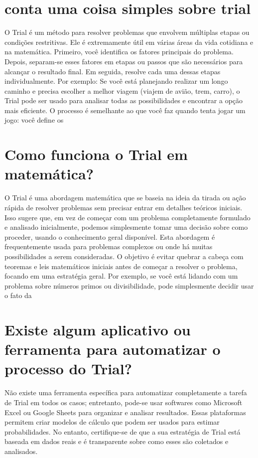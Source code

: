 \documentclass[11pt,a4paper]{article}
\begin{document}
\section{conta uma coisa simples sobre trial}
O Trial é um método para resolver problemas que envolvem múltiplas etapas ou condições restritivas. Ele é extremamente útil em várias áreas da vida cotidiana e na matemática. Primeiro, você identifica os fatores principais do problema. Depois, separam-se esses fatores em etapas ou passos que são necessários para alcançar o resultado final. Em seguida, resolve cada uma dessas etapas individualmente. Por exemplo: Se você está planejando realizar um longo caminho e precisa escolher a melhor viagem (viajem de avião, trem, carro), o Trial pode ser usado para analisar todas as possibilidades e encontrar a opção mais eficiente. O processo é semelhante ao que você faz quando tenta jogar um jogo: você define os

\section{Como funciona o Trial em matemática?}
O Trial é uma abordagem matemática que se baseia na ideia da tirada ou ação rápida de resolver problemas sem precisar entrar em detalhes teóricos iniciais. Isso sugere que, em vez de começar com um problema completamente formulado e analisado inicialmente, podemos simplesmente tomar uma decisão sobre como proceder, usando o conhecimento geral disponível. Esta abordagem é frequentemente usada para problemas complexos ou onde há muitas possibilidades a serem consideradas. O objetivo é evitar quebrar a cabeça com teoremas e leis matemáticos iniciais antes de começar a resolver o problema, focando em uma estratégia geral. Por exemplo, se você está lidando com um problema sobre números primos ou divisibilidade, pode simplesmente decidir usar o fato da

\section{Existe algum aplicativo ou ferramenta para automatizar o processo do Trial?}
Não existe uma ferramenta específica para automatizar completamente a tarefa de Trial em todos os casos; entretanto, pode-se usar softwares como Microsoft Excel ou Google Sheets para organizar e analisar resultados. Essas plataformas permitem criar modelos de cálculo que podem ser usados para estimar probabilidades. No entanto, certifique-se de que a sua estratégia de Trial está baseada em dados reais e é transparente sobre como esses são coletados e analisados.
\end{document}
